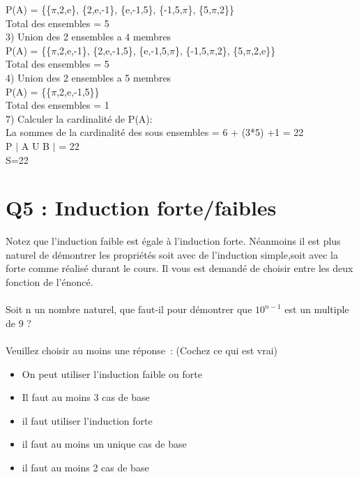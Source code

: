 P(A) = \{\{$\pi$,2,e\}, \{2,e,-1\}, \{e,-1,5\}, \{-1,5,$\pi$\}, \{5,$\pi$,2\}\} \\

Total des ensembles = 5 \\

3) Union des 2 ensembles a 4 membres \\

P(A) = \{\{$\pi$,2,e,-1\}, \{2,e,-1,5\}, \{e,-1,5,$\pi$\}, \{-1,5,$\pi$,2\}, \{5,$\pi$,2,e\}\} \\

Total des ensembles = 5 \\

4) Union des 2 ensembles a 5 membres \\

P(A) = \{\{$\pi$,2,e,-1,5\}\} \\

Total des ensembles = 1 \\

7) Calculer la cardinalité de P(A):\\

La sommes de la cardinalité des sous ensembles = 6 + (3*5) +1 = 22\\

P $|$ A U B $|$ = 22 \\

S=22 \\


\newpage
\section{Q5 : Induction forte/faibles}

\vspace{5mm} %

Notez que l’induction faible est égale à l’induction forte. Néanmoins il est plus naturel de démontrer les propriétés soit avec de l’induction simple,soit avec la forte comme réalisé durant le cours. Il vous est demandé de choisir entre les deux fonction de l’énoncé.\\ \\
Soit n un nombre naturel, que faut-il pour démontrer que $10^{n-1}$ est un multiple de 9 ? \\ \\
Veuillez choisir au moins une réponse : (Cochez ce qui est vrai)\\

\begin{itemize}[label=$\square$]
\item On peut utiliser l’induction faible ou forte
\item Il faut au moins 3 cas de base
\item il faut utiliser l’induction forte
\item il faut au moins un unique cas de base
\item il faut au moins 2 cas de base
\end{itemize}

